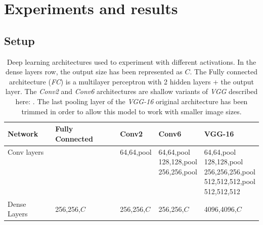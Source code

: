 \begin{itemize}
\end{itemize}

\section{Experiments and results} \label{sec:modulus_experiments}
\subsection{Setup}

\begin{table}[h] \small
	\caption{Deep learning architectures used to experiment with different activations. In the dense layers row, the output size has been represented as $C$. The Fully connected architecture (\textit{FC}) is a multilayer perceptron with 2 hidden layers + the output layer. The \textit{Conv2} and \textit{Conv6} architectures are shallow variants of \textit{VGG} described here: \autocite{simonyan2015}. The last pooling layer of the \textit{VGG-16} original architecture has been trimmed in order to allow this model to work with smaller image sizes.}
	\setcellgapes{3pt}\makegapedcells
	\begin{tabular}[t]{lllll}
		\toprule
		Network              & Fully Connected & Conv2       & Conv6                                                & VGG-16                                                                                  \\ \midrule
		\makecell[l]{Conv layers\\\\\\\\\\} &                & \makecell[l]{64,64,pool\\\\\\\\\\}  & \makecell[l]{64,64,pool\\128,128,pool\\256,256,pool\\\\\\} & \makecell[l]{64,64,pool\\128,128,pool\\256,256,256,pool\\512,512,512,pool\\512,512,512} \\
		Dense Layers         & 256,256,$C$     & 256,256,$C$ & 256,256,$C$                                          & 4096,4096,$C$                                                                           \\

\end{tabular}
\end{table}
